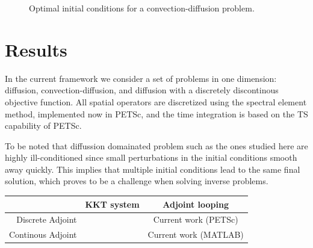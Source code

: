 \documentclass[10pt]{article}
\begin{document}
\begin{figure}[!h]
\centering
{}
\quad
{}
\caption{Optimal initial conditions for a convection-diffusion problem.}
\end{figure}
\section{Results}

In the current framework we consider a set of problems in one dimension: diffusion, convection-diffusion, and diffusion with a discretely discontinous objective function. All spatial operators are discretized using the spectral element method, implemented now in PETSc, and the time integration is based on the TS capability of PETSc.

To be noted that diffussion domainated problem such as the ones studied here are highly ill-conditioned since small perturbations in the initial conditions smooth away quickly. This implies that multiple initial conditions lead to the same final solution, which proves to be a challenge when solving inverse problems.


\begin{tabular}{|r|c|c|}
  \hline
   & KKT system & Adjoint looping \\
  \hline\hline
  Discrete Adjoint &  & Current work (PETSc) \\ 
  Continous Adjoint& & Current work (MATLAB)\\
  \hline
\end{tabular}
\end{document}
